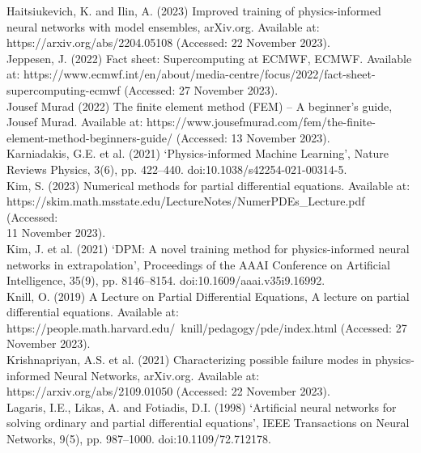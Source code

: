 \documentclass[12pt, openany]{book}
\begin{document}
Haitsiukevich, K. and Ilin, A. (2023) Improved training of physics-informed neural networks with model ensembles, arXiv.org. Available at: https://arxiv.org/abs/2204.05108 (Accessed: 22 November 2023). \\

Jeppesen, J. (2022) Fact sheet: Supercomputing at ECMWF, ECMWF. Available at: https://www.ecmwf.int/en/about/media-centre/focus/2022/fact-sheet-supercomputing-ecmwf (Accessed: 27 November 2023). \\

Jousef Murad (2022) The finite element method (FEM) – A beginner’s guide, Jousef Murad. Available at: https://www.jousefmurad.com/fem/the-finite-element-method-beginners-guide/ (Accessed: 13 November 2023). \\

Karniadakis, G.E. et al. (2021) ‘Physics-informed Machine Learning’, Nature Reviews Physics, 3(6), pp. 422–440. doi:10.1038/s42254-021-00314-5. \\

Kim, S. (2023) Numerical methods for partial differential equations. Available at: \\ https://skim.math.msstate.edu/LectureNotes/NumerPDEs{\_}Lecture.pdf (Accessed: \\ 11 November 2023). \\

Kim, J. et al. (2021) ‘DPM: A novel training method for physics-informed neural networks in extrapolation’, Proceedings of the AAAI Conference on Artificial Intelligence, 35(9), pp. 8146–8154. doi:10.1609/aaai.v35i9.16992. \\

Knill, O. (2019) A Lecture on Partial Differential Equations, A lecture on partial differential equations. Available at: https://people.math.harvard.edu/~knill/pedagogy/pde/index.html (Accessed: 27 November 2023). \\

Krishnapriyan, A.S. et al. (2021) Characterizing possible failure modes in physics-informed Neural Networks, arXiv.org. Available at: https://arxiv.org/abs/2109.01050 (Accessed: 22 November 2023). \\

Lagaris, I.E., Likas, A. and Fotiadis, D.I. (1998) ‘Artificial neural networks for solving ordinary and partial differential equations’, IEEE Transactions on Neural Networks, 9(5), pp. 987–1000. doi:10.1109/72.712178. \\
\end{document}

